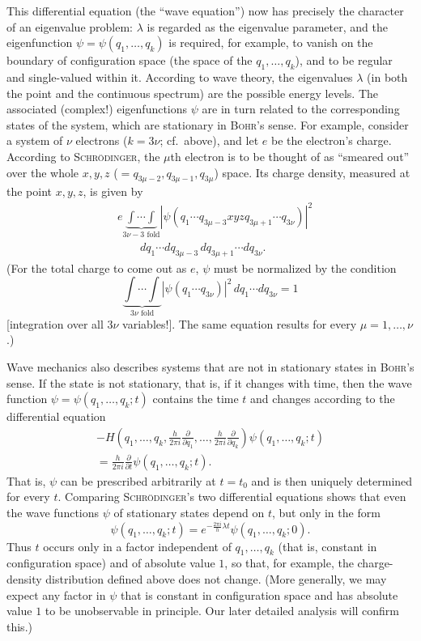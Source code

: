\documentclass[fontsize=13pt,twoside,openany,headings=normal,parskip=false,bookmarkpackage=false,DIV=calc]{scrbook}
\begin{document}
This differential equation (the ``wave equation'') now has precisely the character of an eigenvalue problem: $\lambda$ is regarded as the eigenvalue parameter, and the eigenfunction $\psi=\psi(q_1,\ldots,q_k)$ is required, for example, to vanish on the boundary of configuration space (the space of the $q_1,\ldots,q_k$), and to be regular and single-valued within it. According to wave theory, the eigenvalues $\lambda$ (in both the point and the continuous spectrum) are the possible energy levels. The associated (complex!) eigenfunctions $\psi$ are in turn related to the corresponding states of the system, which are stationary in \textsc{Bohr}'s sense. For example, consider a system of $\nu$ electrons ($k=3\nu$; cf.\ above), and let $e$ be the electron's charge. According to \textsc{Schrödinger}, the $\mu$th electron is to be thought of as ``smeared out'' over the whole $x,y,z$ ($=q_{3\mu-2},q_{3\mu-1},q_{3\mu}$) space. Its charge density, measured at the point $x,y,z$, is given by
\begin{align*}
 &e\underbrace{\int\cdots\int}_{3\nu-3\text{ fold}}
 |\psi(q_1\cdots q_{3\mu-3}xyzq_{3\mu+1}\cdots q_{3\nu})|^2\\
 &\qquad dq_1\cdots dq_{3\mu-3}\,dq_{3\mu+1}\cdots dq_{3\nu}.
\end{align*}
(For the total charge to come out as $e$, $\psi$ must be normalized by the condition
\[
 \underbrace{\int\cdots\int}_{3\nu\text{ fold}}
 |\psi(q_1\cdots q_{3\nu})|^2\,dq_1\cdots dq_{3\nu}=1
\]
[integration over all $3\nu$ variables!]. The same equation results for every $\mu=1,\ldots,\nu$.)

Wave mechanics also describes systems that are not in stationary states in \textsc{Bohr}'s sense. If the state is not stationary, that is, if it changes with time, then the wave function $\psi=\psi(q_1,\ldots,q_k;t)$ contains the time $t$ and changes according to the differential equation
\begin{gather*}
 -H\left(q_1,\ldots,q_k,\frac{h}{2\pi i}\frac{\partial}{\partial q_1},
 \ldots,\frac{h}{2\pi i}\frac{\partial}{\partial q_k}\right)\psi(q_1,\ldots,q_k;t)\\
 =\frac{h}{2\pi i}\frac{\partial}{\partial t}\psi(q_1,\ldots,q_k;t).
\end{gather*}
That is, $\psi$ can be prescribed arbitrarily at $t=t_0$ and is then uniquely determined for every $t$. Comparing \textsc{Schrödinger}'s two differential equations shows that even the wave functions $\psi$ of stationary states depend on $t$, but only in the form
\hypertarget{origpage-9}{}%
\[
 \psi(q_1,\ldots,q_k;t)=e^{-\frac{2\pi i}{h}\lambda t}\psi(q_1,\ldots,q_k;0).
\]
Thus $t$ occurs only in a factor independent of $q_1,\ldots,q_k$ (that is, constant in configuration space) and of absolute value $1$, so that, for example, the charge-density distribution defined above does not change. (More generally, we may expect any factor in $\psi$ that is constant in configuration space and has absolute value $1$ to be unobservable in principle. Our later detailed analysis will confirm this.)
\end{document}
